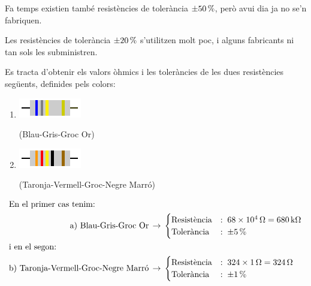 Fa temps existien tamb\'{e} resist\`{e}ncies de toler\`{a}ncia $\SI{\pm 50}{\%}$,
per\`{o} avui dia ja no se'n fabriquen.

Les resist\`{e}ncies de toler\`{a}ncia $\SI{\pm 20}{\%}$ s'utilitzen molt poc, i alguns fabricants
ni tan sols les subministren.


\begin{exemple}
   Es tracta d'obtenir els valors \`{o}hmics i les toler\`{a}ncies de les dues resist\`{e}ncies seg\"{u}ents,
   definides pels colors:
    \begin{enumerate}
       \renewcommand{\labelenumi}{\alph{enumi})}
       \item \begin{minipage}{1.8cm}
               \includegraphics{Imatges/Cap-Resistencies-R1.pdf}
            \end{minipage} (Blau-Gris-Groc Or)
       \item  \begin{minipage}{1.8cm}
               \includegraphics{Imatges/Cap-Resistencies-R2.pdf}
            \end{minipage} (Taronja-Vermell-Groc-Negre Marr\'{o})
    \end{enumerate}
    \begin{align*}
       \intertext{En el primer cas tenim:}
       \text{a) Blau-Gris-Groc Or}\,  &\rightarrow\,
       \begin{cases}
          \text{Resist\`{e}ncia} &:\; \SI{68e4}{\ohm} = \SI{680}{k\ohm} \\
          \text{Toler\`{a}ncia}  &:\; \SI{\pm 5}{\%}
       \end{cases} \\
       \intertext{i en el segon:}
       \text{b) Taronja-Vermell-Groc-Negre Marr\'{o}}\,  &\rightarrow\,
       \begin{cases}
          \text{Resist\`{e}ncia} &:\;324 \times \SI{1}{\ohm} = \SI{324}{\ohm} \\
          \text{Toler\`{a}ncia}  &:\; \SI{\pm 1}{\%}
       \end{cases}
    \end{align*}
\end{exemple}

